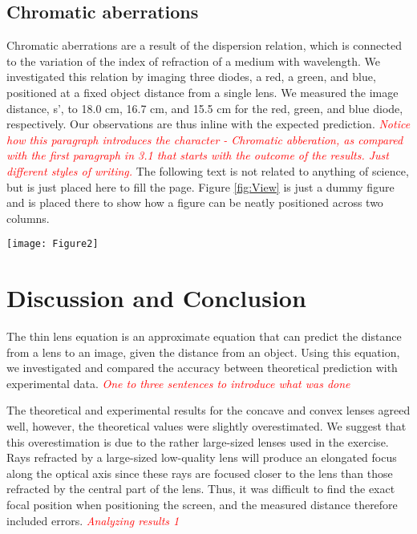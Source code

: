 \documentclass[fleqn,10pt]{SelfArx} %
\begin{document}
\subsection{Chromatic aberrations}
Chromatic aberrations are a result of the dispersion relation, which is connected to the variation of the index of refraction of a medium with wavelength. We investigated this relation by imaging three diodes, a red, a green, and blue, positioned at a fixed object distance from a single lens. We measured the image distance, {s'}, to 18.0 cm, 16.7 cm, and 15.5 cm for the red, green, and blue diode, respectively. Our observations are thus inline with the expected prediction.  \textcolor{red}{\textit{Notice how this paragraph introduces the character - Chromatic abberation, as compared with the first paragraph in 3.1 that starts with the outcome of the results. Just different styles of writing.}} The following text is not related to anything of science, but is just placed here to fill the page. Figure \ref{fig:View} is  just a dummy figure and is placed there to show how a figure can be neatly positioned across two columns.

\lipsum[12] %

\lipsum[15] %

\begin{figure*}[ht]\centering %
\texttt{[image: Figure2]}
\caption{Example of a double column figure with three subplots. Make sure that you clearly describe each panel and that the resolution of you figure is at least 300 dpi.}
\label{fig:View}
\end{figure*}

\section{Discussion and Conclusion}
\noindent
The thin lens equation is an approximate equation that can predict the distance from a lens to an image, given the distance from an object. Using this equation, we investigated and compared the accuracy between theoretical prediction with experimental data. \textcolor{red}{\textit{One to three sentences to introduce what was done}} 

The theoretical and experimental results for the concave and convex lenses agreed well, however, the theoretical values were slightly overestimated. We suggest that this overestimation is due to the rather large-sized lenses used in the exercise. Rays refracted by a large-sized low-quality lens will produce an elongated focus along the optical axis since these rays are focused closer to the lens than those refracted by the central part of the lens. Thus, it was difficult to find the exact focal position when positioning the screen, and the measured distance  therefore included errors. \textcolor{red}{\textit{Analyzing results 1}}
\end{document}

